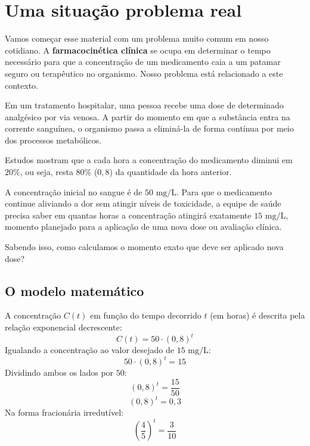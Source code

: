 \documentclass[12pt,a4paper]{report}
\begin{document}
	\clearpage
		
	\chapter{Uma situação problema real}
	\label{chap:problema}
	
	Vamos começar esse material com um problema muito comum em nosso cotidiano. A \textbf{farmacocinética clínica} se ocupa em determinar o tempo necessário para que a concentração de um medicamento caia a um patamar seguro ou terapêutico no organismo. Nosso problema está relacionado a este contexto.
	
	\begin{destaque}
		\label{dest:problema}
		Em um tratamento hospitalar, uma pessoa recebe uma dose de determinado analgésico por via venosa. A partir do momento em que a substância entra na corrente sanguínea, o organismo passa a eliminá-la de forma contínua por meio dos processos metabólicos.
		
		Estudos mostram que a cada hora a concentração do medicamento diminui em $20\%$, ou seja, resta $80\%$ ($0{,}8$) da quantidade da hora anterior.
		
		A concentração inicial no sangue é de $50\text{ mg/L}$. Para que o medicamento continue aliviando a dor sem atingir níveis de toxicidade, a equipe de saúde precisa saber em quantas horas a concentração atingirá exatamente $15\text{ mg/L}$, momento planejado para a aplicação de uma nova dose ou avaliação clínica.
		
		Sabendo isso, como calculamos o momento exato que deve ser aplicado nova dose?
	\end{destaque}
	
	\section{O modelo matemático}
	A concentração $C(t)$ em função do tempo decorrido $t$ (em horas) é descrita pela relação exponencial decrescente:
	$$C(t) = 50 \cdot (0{,}8)^t$$
	Igualando a concentração ao valor desejado de $15\text{ mg/L}$:
	$$50 \cdot (0{,}8)^t = 15$$
	Dividindo ambos os lados por $50$:
	$$(0{,}8)^t = \frac{15}{50}$$
	$$(0{,}8)^t = 0{,}3$$
	Na forma fracionária irredutível:
	$$\left(\frac{4}{5}\right)^t = \frac{3}{10}$$
	
\end{document}
